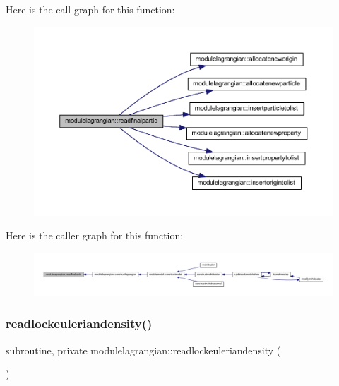 Here is the call graph for this function\+:\nopagebreak
\begin{figure}[H]
\begin{center}
\leavevmode
\includegraphics[width=350pt]{namespacemodulelagrangian_aa8ba43a560dd11df5632a522066b74a6_cgraph}
\end{center}
\end{figure}
Here is the caller graph for this function\+:\nopagebreak
\begin{figure}[H]
\begin{center}
\leavevmode
\includegraphics[width=350pt]{namespacemodulelagrangian_aa8ba43a560dd11df5632a522066b74a6_icgraph}
\end{center}
\end{figure}
\mbox{\label{namespacemodulelagrangian_a3d2b3737568ce2b7e2998cbd2192c685}} 
\subsubsection{\texorpdfstring{readlockeuleriandensity()}{readlockeuleriandensity()}}
{\footnotesize\ttfamily subroutine, private modulelagrangian\+::readlockeuleriandensity (\begin{DoxyParamCaption}{ }\end{DoxyParamCaption})\hspace{0.3cm}{\ttfamily [private]}}

